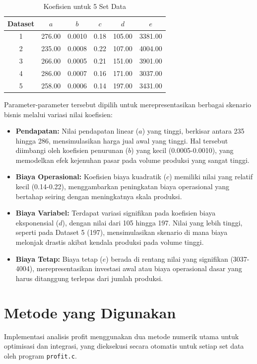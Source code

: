 \documentclass[conference]{IEEEtran}
\begin{document}
\begin{table}[htbp]
\caption{Koefisien untuk 5 Set Data}
\begin{center}
\begin{tabular}{|c|c|c|c|c|c|}
\hline
\textbf{Dataset} & \textbf{$a$} & \textbf{$b$} & \textbf{$c$} & \textbf{$d$} & \textbf{$e$} \\
\hline
1 & 276.00 & 0.0010 & 0.18 & 105.00 & 3381.00 \\
\hline
2 & 235.00 & 0.0008 & 0.22 & 107.00 & 4004.00 \\
\hline
3 & 266.00 & 0.0005 & 0.21 & 151.00 & 3901.00 \\
\hline
4 & 286.00 & 0.0007 & 0.16 & 171.00 & 3037.00 \\
\hline
5 & 258.00 & 0.0006 & 0.14 & 197.00 & 3431.00 \\
\hline
\end{tabular}
\label{tab:koefisien}
\end{center}
\end{table}

Parameter-parameter tersebut dipilih untuk merepresentasikan berbagai skenario bisnis melalui variasi nilai koefisien:
\begin{itemize}
    \item \textbf{Pendapatan:} Nilai pendapatan linear ($a$) yang tinggi, berkisar antara 235 hingga 286, mensimulasikan harga jual awal yang tinggi. Hal tersebut diimbangi oleh koefisien penurunan ($b$) yang kecil (0.0005-0.0010), yang memodelkan efek kejenuhan pasar pada volume produksi yang sangat tinggi.
    \item \textbf{Biaya Operasional:} Koefisien biaya kuadratik ($c$) memiliki nilai yang relatif kecil (0.14-0.22), menggambarkan peningkatan biaya operasional yang bertahap seiring dengan meningkatnya skala produksi.
    \item \textbf{Biaya Variabel:} Terdapat variasi signifikan pada koefisien biaya eksponensial ($d$), dengan nilai dari 105 hingga 197. Nilai yang lebih tinggi, seperti pada Dataset 5 (197), mensimulasikan skenario di mana biaya melonjak drastis akibat kendala produksi pada volume tinggi.
    \item \textbf{Biaya Tetap:} Biaya tetap ($e$) berada di rentang nilai yang signifikan (3037-4004), merepresentasikan investasi awal atau biaya operasional dasar yang harus ditanggung terlepas dari jumlah produksi.
\end{itemize}

\section{Metode yang Digunakan}
Implementasi analisis profit menggunakan dua metode numerik utama untuk optimisasi dan integrasi, yang dieksekusi secara otomatis untuk setiap set data oleh program \texttt{profit.c}.
\end{document}
